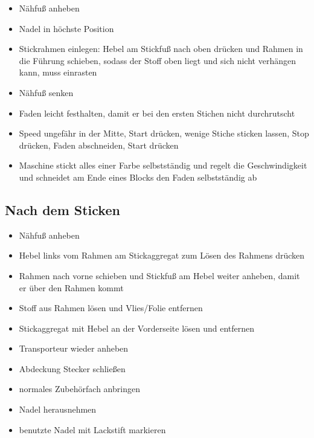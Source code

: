 \documentclass{\basedir/fablab-document}
\begin{document}
\vspace{1em}

\begin{itemize}
 \item Nähfuß anheben
 \item Nadel in höchste Position
 \item Stickrahmen einlegen: Hebel am Stickfuß nach oben drücken und Rahmen in die Führung schieben, sodass der Stoff oben liegt und sich nicht verhängen kann, muss einrasten
 \item Nähfuß senken
 \item Faden leicht festhalten, damit er bei den ersten Stichen nicht durchrutscht
 \item Speed ungefähr in der Mitte, Start drücken, wenige Stiche sticken lassen, Stop drücken, Faden abschneiden, Start drücken
 \item Maschine stickt alles einer Farbe selbstständig und regelt die Geschwindigkeit und schneidet am Ende eines Blocks den Faden selbstständig ab
\end{itemize}


\subsection{Nach dem Sticken}
\begin{itemize}
 \item Nähfuß anheben
 \item Hebel links vom Rahmen am Stickaggregat zum Lösen des Rahmens drücken
 \item Rahmen nach vorne schieben und Stickfuß am Hebel weiter anheben, damit er über den Rahmen kommt
 \item Stoff aus Rahmen lösen und Vlies/Folie entfernen
 \item Stickaggregat mit Hebel an der Vorderseite lösen und entfernen
 \item Transporteur wieder anheben
 \item Abdeckung Stecker schließen
 \item normales Zubehörfach anbringen
 \item Nadel herausnehmen
 \item benutzte Nadel mit Lackstift markieren
\end{itemize}

\newpage
{}
\end{document}
